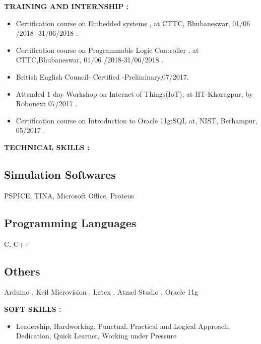 \documentclass[a4]{article}
\begin{document}
\vspace{3mm}
\textbf{TRAINING AND INTERNSHIP : } 
\begin{itemize}
	\item Certification course on Embedded systems , at CTTC, Bhubaneswar, 01/06
/2018 -31/06/2018 .
	\item Certification course on Programmable Logic Controller , at CTTC,Bhubaneswar, 01/06
/2018-31/06/2018 .
         \item British English Council- Certified -Preliminary,07/2017. 
         \item Attended 1 day Workshop on Internet of Things(IoT), at IIT-Kharagpur, by Robonext 07/2017 .
         \item Certification course on Introduction to Oracle 11g:SQL  at, NIST, Berhampur, 
05/2017 .
\end{itemize}

\vspace{3mm}
\textbf{TECHNICAL SKILLS : } 

\subsection{Simulation Softwares}	
      PSPICE, TINA, Microsoft Office, Proteus
\subsection{Programming Languages}
 C, C++
\subsection{Others}
Arduino , Keil Microvision , Latex , Atmel Studio , Oracle 11g

\vspace{3mm}
\textbf{SOFT SKILLS : } 
\begin{itemize}
	\item Leadership,  Hardworking,  Punctual,  Practical  and Logical Approach, Dedication, Quick Learner, Working 
under Pressure 
	
\end{itemize}
\end{document}
